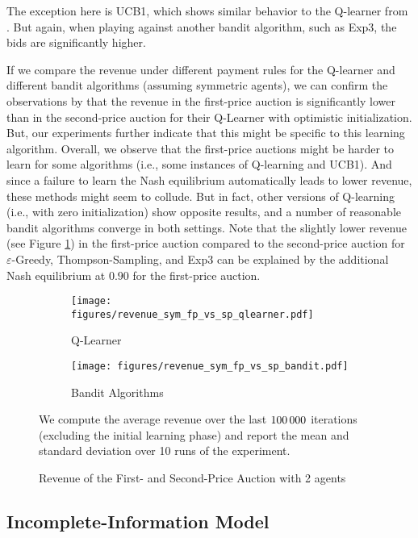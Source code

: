 \documentclass{article}
\begin{document}
\begin{appendix}
The exception here is UCB1, which shows similar behavior to the Q-learner from \citet{banchio2022artificial}. 
But again, when playing against another bandit algorithm, such as Exp3, the bids are significantly higher.

If we compare the revenue under different payment rules for the Q-learner and different bandit algorithms (assuming symmetric agents), we can confirm the observations by \citet{banchio2022artificial} that the revenue in the first-price auction is significantly lower than in the second-price auction for their Q-Learner with optimistic initialization. 
But, our experiments further indicate that this might be specific to this learning algorithm. 
Overall, we observe that the first-price auctions might be harder to learn for some algorithms (i.e., some instances of Q-learning and UCB1). 
And since a failure to learn the Nash equilibrium automatically leads to lower revenue, these methods might seem to collude. But in fact, other versions of Q-learning (i.e., with zero initialization) show opposite results, and a number of reasonable bandit algorithms converge in both settings. 
Note that the slightly lower revenue (see Figure \ref{fig:compl_info_revenue}) in the first-price auction compared to the second-price auction for $\varepsilon$-Greedy, Thompson-Sampling, and Exp3 can be explained by the additional Nash equilibrium at $0.90$ for the first-price auction.

\begin{figure}[h]
	\begin{center}
		\begin{subfigure}{0.45\textwidth}
			\centering
			\texttt{[image: figures/revenue\_sym\_fp\_vs\_sp\_qlearner.pdf]}
			\caption{Q-Learner}
		\end{subfigure}
		\begin{subfigure}{0.45\textwidth}
			\centering
			\texttt{[image: figures/revenue\_sym\_fp\_vs\_sp\_bandit.pdf]}
			\caption{Bandit Algorithms}
		\end{subfigure}
		\caption{Revenue of the First- and Second-Price Auction with 2 agents}
		\label{fig:compl_info_revenue}
	\end{center}
	\footnotesize
	We compute the average revenue over the last $100\thinspace000$ iterations (excluding the initial learning phase) and report the mean and standard deviation over 10 runs of the experiment.
\end{figure}
\newpage
\subsection{Incomplete-Information Model}

\end{appendix}
\end{document}
